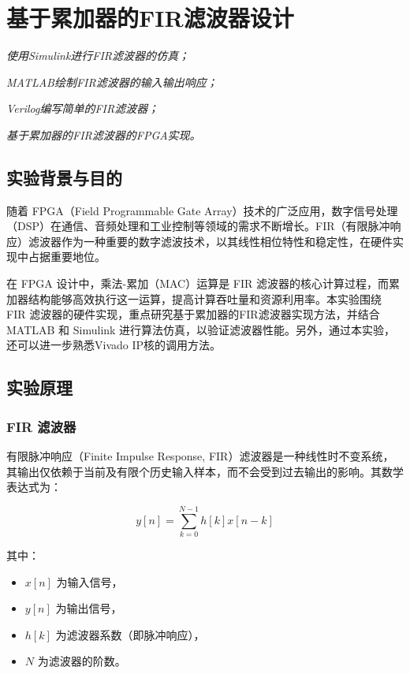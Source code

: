 \chapter{基于累加器的FIR滤波器设计}
\begin{introduction}
  \item \textit{使用Simulink进行FIR滤波器的仿真；}
  \item \textit{MATLAB绘制FIR滤波器的输入输出响应；}
  \item \textit{Verilog编写简单的FIR滤波器；}
  \item \textit{基于累加器的FIR滤波器的FPGA实现。}
\end{introduction}
\section{实验背景与目的}
随着 FPGA（Field Programmable Gate Array）技术的广泛应用，数字信号处理（DSP）在通信、音频处理和工业控制等领域的需求不断增长。FIR（有限脉冲响应）滤波器作为一种重要的数字滤波技术，以其线性相位特性和稳定性，在硬件实现中占据重要地位。

在 FPGA 设计中，乘法-累加（MAC）运算是 FIR 滤波器的核心计算过程，而累加器结构能够高效执行这一运算，提高计算吞吐量和资源利用率。本实验围绕 FIR 滤波器的硬件实现，重点研究基于累加器的FIR滤波器实现方法，并结合 MATLAB 和 Simulink 进行算法仿真，以验证滤波器性能。另外，通过本实验，还可以进一步熟悉Vivado IP核的调用方法。

\section{实验原理}

\subsection{FIR 滤波器}

有限脉冲响应（Finite Impulse Response, FIR）滤波器是一种线性时不变系统，其输出仅依赖于当前及有限个历史输入样本，而不会受到过去输出的影响。其数学表达式为：

\begin{equation}
    y[n] = \sum_{k=0}^{N-1} h[k] x[n-k]
\end{equation}

其中：
\begin{itemize}
    \item $x[n]$ 为输入信号，
    \item $y[n]$ 为输出信号，
    \item $h[k]$ 为滤波器系数（即脉冲响应），
    \item $N$ 为滤波器的阶数。
\end{itemize}

